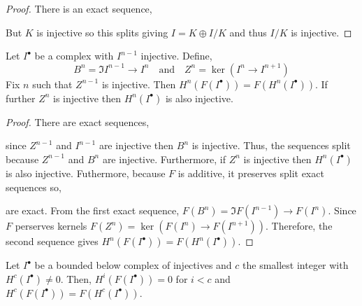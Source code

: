 \documentclass[12pt]{article}
\begin{document}
\begin{proof}
There is an exact sequence,
\begin{center}
\end{center}
But $K$ is injective so this splits giving $I = K \oplus I/K$ and thus $I/K$ is injective.
\end{proof}

\begin{lemma}
Let $I^\bullet$ be a complex with $I^{n-1}$ injective. Define, 
\[ B^n = \Im{I^{n-1} \to I^n} \quad \text{and} \quad Z^n = \ker{(I^n \to I^{n+1})} \]
Fix $n$ such that $Z^{n-1}$ is injective. Then $H^n(F(I^\bullet)) = F(H^n(I^\bullet))$. If further $Z^n$ is injective then $H^n(I^\bullet)$ is also injective.
\end{lemma}

\begin{proof}
There are exact sequences,
\begin{center}
\end{center}
since $Z^{n-1}$ and $I^{n-1}$ are injective then $B^n$ is injective. Thus, the sequences split because $Z^{n-1}$ and $B^n$ are injective. Furthermore, if $Z^n$ is injective then $H^n(I^\bullet)$ is also injective. Futhermore, because $F$ is additive, it preserves split exact sequences so,
\begin{center}
\end{center}
are exact. From the first exact sequence, $F(B^n) = \Im{F(I^{n-1}) \to F(I^n)}$. Since $F$ perserves kernels $F(Z^n) = \ker{(F(I^n) \to F(I^{n+1}))}$. Therefore, the second sequence gives $H^n(F(I^\bullet)) = F(H^n(I^\bullet))$.
\end{proof}

\begin{lemma} \label{compute_first_nonzero_cohomology}
Let $I^\bullet$ be a bounded below complex of injectives and $c$ the smallest integer with $H^c(I^\bullet) \neq 0$. Then, $H^i(F(I^\bullet)) = 0$ for $i < c$ and $H^c(F(I^\bullet)) = F(H^c(I^\bullet))$.
\end{lemma}
\end{document}
